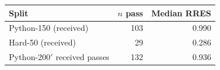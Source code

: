\begin{tabular}{lrr}
\toprule
\textbf{Split} & \textbf{$n$ pass} & \textbf{Median RRES} \\
\midrule
Python-150 (received) & 103 & 0.990 \\
Hard-50 (received) & 29 & 0.286 \\
Python-200$'$ received passes & 132 & 0.936 \\
\bottomrule
\end{tabular}

